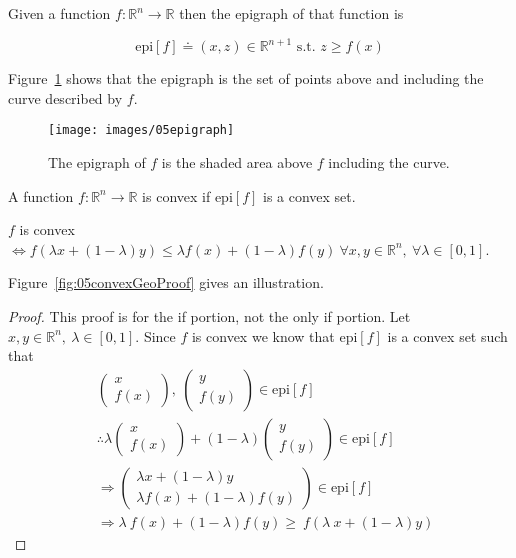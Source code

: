 \begin{definition}
Given a function $f:\mathbb{R}^n\to\mathbb{R}$ then the epigraph of that function is

\begin{equation*}
\text{epi}[f] \doteq (x,z)\in\mathbb{R}^{n+1} \text{~s.t.~} z\geq f(x)
\end{equation*}

Figure~\ref{fig:05epigraph} shows that the epigraph is the set of points above and including the curve described by $f$.
\end{definition}

\begin{figure}[ht!]
\centering
\texttt{[image: images/05epigraph]}
\caption{The epigraph of $f$ is the shaded area above $f$ including the curve.}%
\label{fig:05epigraph}
\end{figure}

\begin{definition}
A function $f:\mathbb{R}^n\to\mathbb{R}$ is convex if $\text{epi}[f]$ is a convex set.
\end{definition}

\begin{theorem}
$f$ is convex $\Leftrightarrow f(\lambda x + (1-\lambda)y)\leq \lambda f(x) + (1-\lambda)f(y)~\forall x,y\in\mathbb{R}^n,~\forall \lambda\in[0,1]$.
\end{theorem}
Figure~\ref{fig:05convexGeoProof} gives an illustration.
\begin{proof}
This proof is for the if portion, not the only if portion.
Let $x,y\in\mathbb{R}^n,~\lambda\in[0,1]$.
Since $f$ is convex we know that $\text{epi}[f]$ is a convex set such that
\begin{align*}
&\left(\begin{array}{c} x \\ f(x) \end{array}\right),~\left(\begin{array}{c} y \\ f(y) \end{array}\right) \in\text{epi}[f] \\
&\therefore\lambda\left(\begin{array}{c} x \\ f(x) \end{array}\right) + (1-\lambda)\left(\begin{array}{c} y \\ f(y) \end{array}\right) \in\text{epi}[f] \\
&\Rightarrow\left(\begin{array}{c} \lambda x+(1-\lambda)y \\ \lambda f(x) + (1-\lambda)f(y) \end{array}\right) \in\text{epi}[f] \\
&\Rightarrow\lambda~f (x) + (1-\lambda) f (y) \geq~f (\lambda~x + (1-\lambda) y)
\end{align*}
\end{proof}

